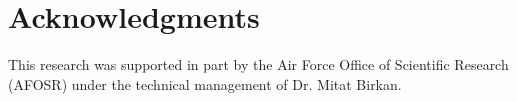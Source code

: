 \documentclass{essci}
\begin{document}
\section*{Acknowledgments}

This research was supported in part by the Air Force Office of Scientific Research (AFOSR) under the technical management of Dr. Mitat Birkan.



\end{document}
